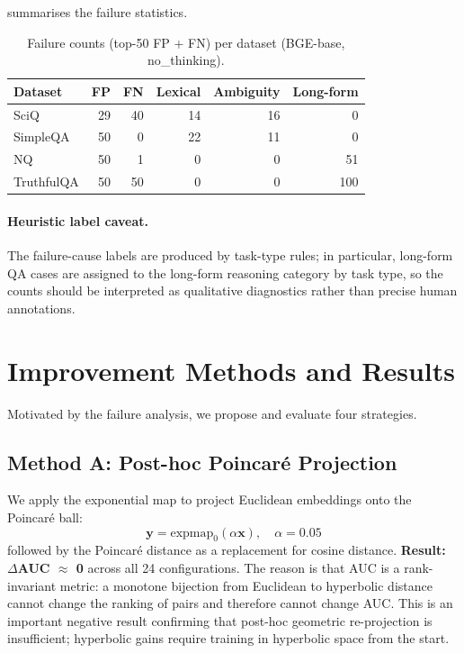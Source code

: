 \documentclass{article}
\begin{document}
 summarises the failure statistics.

\begin{table}[t]
\centering
\caption{Failure counts (top-50 FP + FN) per dataset (BGE-base, no\_thinking).}
\label{tab:failure}
\setlength{\tabcolsep}{5pt}
\begin{tabular}{lrrrrr}
\toprule
\textbf{Dataset} & \textbf{FP} & \textbf{FN}
  & \textbf{Lexical} & \textbf{Ambiguity} & \textbf{Long-form} \\
\midrule
SciQ       & 29 & 40 & 14 & 16 &  0 \\
SimpleQA   & 50 &  0 & 22 & 11 &  0 \\
NQ         & 50 &  1 &  0 &  0 & 51 \\
TruthfulQA & 50 & 50 &  0 &  0 & 100 \\
\bottomrule
\end{tabular}
\end{table}

\paragraph{Heuristic label caveat.}
The failure-cause labels are produced by task-type rules; in particular,
long-form QA cases are assigned to the long-form reasoning category by task type,
so the counts should be interpreted as qualitative diagnostics rather than precise
human annotations.

\section{Improvement Methods and Results}
\label{sec:improvement}

Motivated by the failure analysis, we propose and evaluate four strategies.

\subsection{Method A: Post-hoc Poincaré Projection}

We apply the exponential map to project Euclidean embeddings onto the Poincaré ball:
\begin{equation}
  \mathbf{y} = \text{expmap}_0(\alpha \mathbf{x}), \quad \alpha = 0.05
\end{equation}
followed by the Poincaré distance as a replacement for cosine distance.
\textbf{Result: $\Delta$AUC $\approx$ 0} across all 24 configurations.
The reason is that AUC is a rank-invariant metric: a monotone bijection from
Euclidean to hyperbolic distance cannot change the ranking of pairs and therefore
cannot change AUC.
This is an important negative result confirming that post-hoc geometric
re-projection is insufficient; hyperbolic gains require training in hyperbolic space
from the start.
\end{document}
